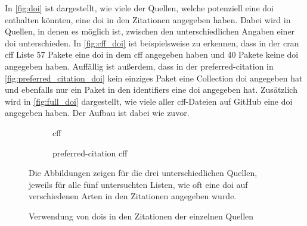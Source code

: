 In \autoref{fig:doi} ist dargestellt, wie viele der Quellen, welche potenziell eine \gls{doi} enthalten könnten, eine \gls{doi} in den Zitationen angegeben haben.
Dabei wird in Quellen, in denen es möglich ist, zwischen den unterschiedlichen Angaben einer \gls{doi} unterschieden.
In \autoref{fig:cff_doi} ist beispielsweise zu erkennen, dass in der \gls{cran} \gls{cff} Liste 57 Pakete eine \gls{doi} in dem \gls{cff} angegeben haben und 40 Pakete keine \gls{doi} angegeben haben.
Auffällig ist außerdem, dass in der \glqq preferred-citation\grqq{} in \autoref{fig:preferred_citation_doi} kein einziges Paket eine Collection \gls{doi} angegeben hat und ebenfalls nur ein Paket in den \glqq identifiers\grqq{} eine \gls{doi} angegeben hat.
Zusätzlich wird in \autoref{fig:full_doi} dargestellt, wie viele aller \gls{cff}-Dateien auf GitHub eine \gls{doi} angegeben haben.
Der Aufbau ist dabei wie zuvor.

\begin{figure}
    \begin{subfigure}{.5\textwidth}
        \centering
        
        \caption{\gls{cff}}
        \label{fig:cff_doi}
    \end{subfigure}%
    \begin{subfigure}{.5\textwidth}
        \centering
        
        \caption{\glqq preferred-citation\grqq{} \gls{cff}}
        \label{fig:preferred_citation_doi}
    \end{subfigure}
    \begin{center}
        \begin{subfigure}{.5\textwidth}
            \centering
            
            \caption{}
            \label{fig:bib_doi}
        \end{subfigure}
    \end{center}
    \caption{Verwendung von \gls{doi}s in den Zitationen der einzelnen Quellen}
    \label{fig:doi}
    \small
    Die Abbildungen zeigen für die drei unterschiedlichen Quellen, jeweils für alle fünf untersuchten Listen, wie oft eine \gls{doi} auf verschiedenen Arten in den Zitationen angegeben wurde.
\end{figure}

